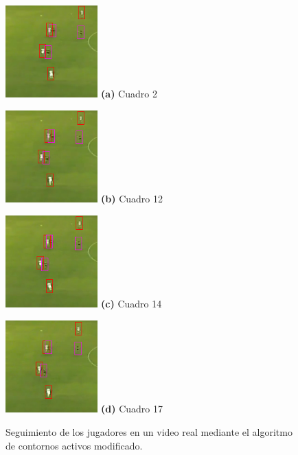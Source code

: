 \begin{figure}[H]
    \centering
    \begin{minipage}[t]{.25\textwidth}
      \includegraphics[width=1.4in]{./images/cropped_rendered002.png}
      \centering
      \footnotesize
      \textbf{(a)} Cuadro 2
    \end{minipage}
    \hspace{-0.3cm}
    \begin{minipage}[t]{.25\textwidth}
      \includegraphics[width=1.4in]{./images/cropped_rendered007.png}
      \centering
      \footnotesize
      \textbf{(b)} Cuadro 12
    \end{minipage}
    \hspace{-0.3cm}
    \begin{minipage}[t]{.25\textwidth}
      \includegraphics[width=1.4in]{./images/cropped_rendered012.png}
      \centering
      \footnotesize
      \textbf{(c)} Cuadro 14
    \end{minipage}
    \hspace{-0.3cm}
    \begin{minipage}[t]{.25\textwidth}
      \includegraphics[width=1.4in]{./images/cropped_rendered017.png}
      \centering
      \footnotesize
      \textbf{(d)} Cuadro 17
    \end{minipage}
    \caption{Seguimiento de los jugadores en un video real mediante el algoritmo de contornos activos modificado.
    \label{fig:boca-activeContour}
    }
\end{figure}

